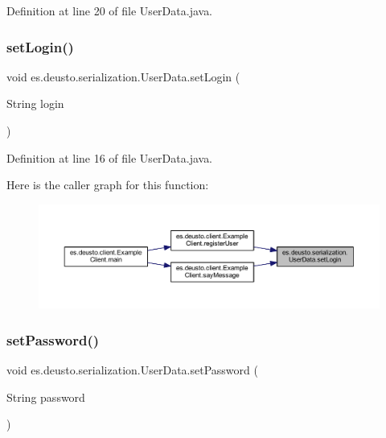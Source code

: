 Definition at line 20 of file User\+Data.\+java.

\mbox{\label{classes_1_1deusto_1_1serialization_1_1_user_data_a4a1de61a3a73d1d217be31c868f5674b}} 
\subsubsection{\texorpdfstring{setLogin()}{setLogin()}}
{\footnotesize\ttfamily void es.\+deusto.\+serialization.\+User\+Data.\+set\+Login (\begin{DoxyParamCaption}\item[{String}]{login }\end{DoxyParamCaption})}



Definition at line 16 of file User\+Data.\+java.

Here is the caller graph for this function\+:
\nopagebreak
\begin{figure}[H]
\begin{center}
\leavevmode
\includegraphics[width=350pt]{classes_1_1deusto_1_1serialization_1_1_user_data_a4a1de61a3a73d1d217be31c868f5674b_icgraph}
\end{center}
\end{figure}
\mbox{\label{classes_1_1deusto_1_1serialization_1_1_user_data_a28efba1d140f0b371bfc777d1c825614}} 
\subsubsection{\texorpdfstring{setPassword()}{setPassword()}}
{\footnotesize\ttfamily void es.\+deusto.\+serialization.\+User\+Data.\+set\+Password (\begin{DoxyParamCaption}\item[{String}]{password }\end{DoxyParamCaption})}



